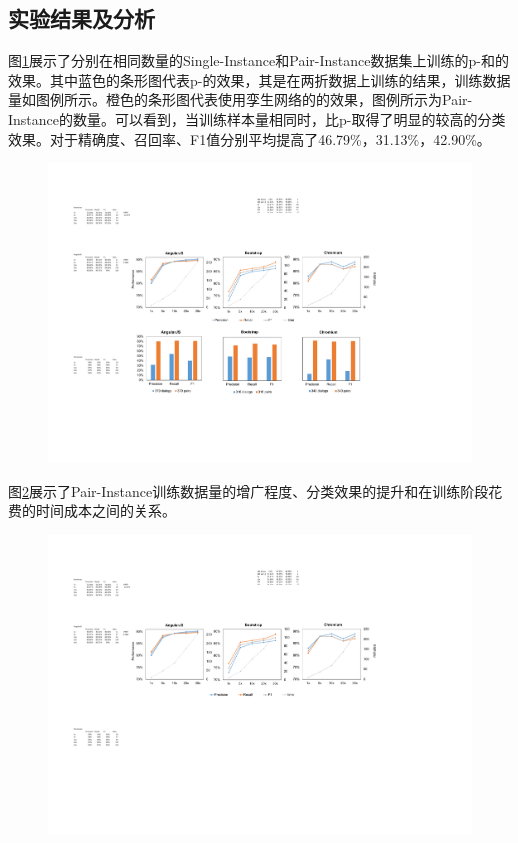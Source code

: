 \subsection{实验结果及分析}

图\ref{fig:p-FR}展示了分别在相同数量的Single-Instance和Pair-Instance数据集上训练的p-{\tool}和{\tool}的效果。其中蓝色的条形图代表p-{\tool}的效果，其是在两折数据上训练的结果，训练数据量如图例所示。橙色的条形图代表使用孪生网络的{\tool}的效果，图例所示为Pair-Instance的数量。可以看到，当训练样本量相同时，{\tool}比p-{\tool}取得了明显的较高的分类效果。{\tool}对于精确度、召回率、F1值分别平均提高了46.79\%，31.13\%，42.90\%。

\begin{figure}[htb]
\centering
\includegraphics[width=\textwidth]{Img/p-FRvsFR.pdf}
\label{fig:p-FR}
\end{figure} 

图\ref{fig:FR-size}展示了Pair-Instance训练数据量的增广程度、分类效果的提升和在训练阶段花费的时间成本之间的关系。

\begin{figure}[htb]
\centering
\includegraphics[width=\textwidth]{Img/FRMiner_size.pdf}
\label{fig:FR-size}
\end{figure} 

